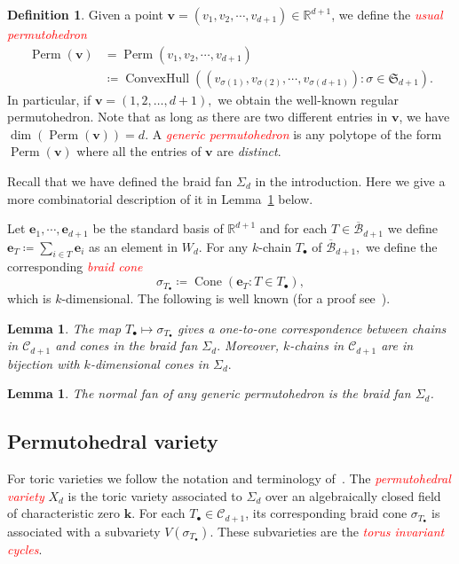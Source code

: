 \documentclass[10pt,a4paper]{amsart}
\newtheorem{lemm}[thm]{Lemma}
\theoremstyle{definition}
\newtheorem{defi}[thm]{Definition}
\newcommand\R{{\mathbb R}}
\newcommand\fS{{\mathfrak S}}
\newcommand{\bm}[1]{{\boldsymbol{#1}}}
\newcommand\e{\bm{e}}
\renewcommand\v{\bm{v}}
\newcommand{\important}[1]{\emph{\textcolor{red}{#1}}}
\DeclareMathOperator{\conv}{ConvexHull}
\DeclareMathOperator{\cone}{Cone}
\DeclareMathOperator{\Perm}{Perm}
\renewcommand{\k}{\mathbf{k}}
\newcommand{\hB}{\overline{\mathcal B}}
\newcommand{\CC}{\mathcal{C}}
\begin{document}
\begin{defi}
	Given a point $\v = (v_1,v_2,\cdots,v_{d+1}) \in \R^{d+1}$, we define the \important{usual permutohedron}
	\[
\begin{aligned}	
	\Perm(\v) &= \Perm (v_1,v_2,\cdots, v_{d+1}) \\
	&\coloneqq \conv\left( \left(v_{\sigma(1)},v_{\sigma(2)},\cdots, v_{\sigma({d+1})}\right): \sigma\in \fS_{d+1}\right).
\end{aligned}	
	\]
	In particular, if $\v = (1, 2, \dots, {d+1}),$ we obtain the well-known regular permutohedron. %
	Note that as long as there are two different entries in $\v$, we have $\dim (\Perm(\v)) = d$. A \important{generic permutohedron} is any polytope of the form $\Perm(\v)$ where all the entries of $\v$ are \emph{distinct}.
\end{defi}



Recall that we have defined the braid fan $\Sigma_d$ in the introduction. Here we give a more combinatorial description of it in Lemma~\ref{lem:1-1} below.

Let $\e_1,\cdots,\e_{d+1}$ be the standard basis of $\R^{d+1}$ and for each $T\in \hB_{d+1}$ we define $\e_T\coloneqq \sum_{i\in T}\e_i$ as an element in $W_d$. For any $k$-chain $T_\bullet$ of $\hB_{d+1},$ we define the corresponding \important{braid cone}
\[\sigma_{T_\bullet}\coloneqq \cone(\e_T: T\in T_\bullet),\]
which is $k$-dimensional. The following is well known (for a proof see~\cite[Proposition~3.5]{nested}).
\begin{lemm}\label{lem:1-1}
	The map $T_\bullet \mapsto \sigma_{T_\bullet}$ gives a one-to-one correspondence between chains in $\CC_{d+1}$ and cones in the braid fan $\Sigma_d.$ Moreover, $k$-chains in $\CC_{d+1}$ are in bijection with $k$-dimensional cones in $\Sigma_d.$
	
	
\end{lemm}

\begin{lemm}\label{lem:generic}
	The normal fan of any generic permutohedron is the braid fan $\Sigma_d$. 
\end{lemm}



\subsection{Permutohedral variety}
For toric varieties we follow the notation and terminology of~\cite{fulton}. The \important{permutohedral variety} $X_d$ is the toric variety associated to $\Sigma_d$ over an algebraically closed field of characteristic zero $\k$. For each $T_\bullet\in\CC_{d+1}$, its corresponding braid cone $\sigma_{T_{\bullet}}$ is associated with a subvariety $V(\sigma_{T_{\bullet}})$. These subvarieties are the \important{torus invariant cycles}.
\end{document}
